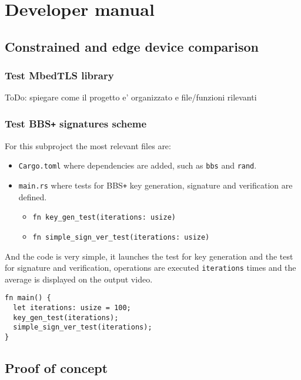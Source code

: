 
\section{Developer manual}
\subsection{Constrained and edge device comparison}
\subsubsection{Test MbedTLS library}
{\color{red} ToDo: spiegare come il progetto e' organizzato e file/funzioni rilevanti}
\subsubsection{Test BBS\texttt{+} signatures scheme}
For this subproject the most relevant files are:
\begin{itemize}
  \item \texttt{Cargo.toml} where dependencies are added, such as  
  \texttt{bbs} and \texttt{rand}. 
  \item \texttt{main.rs} where tests for BBS\texttt{+} key generation, signature and verification are defined. 
  \begin{itemize} 
    \item \texttt{fn key\_gen\_test(iterations: usize)}
    \item \texttt{fn simple\_sign\_ver\_test(iterations: usize)}
  \end{itemize}
\end{itemize}
And the code is very simple, it launches the test for key generation and the test for signature and verification, operations are executed \texttt{iterations} times and the average is displayed on the output video. 
\begin{lstlisting}[frame=single]
fn main() {
  let iterations: usize = 100;
  key_gen_test(iterations);
  simple_sign_ver_test(iterations);
}
\end{lstlisting}

\subsection{Proof of concept}
